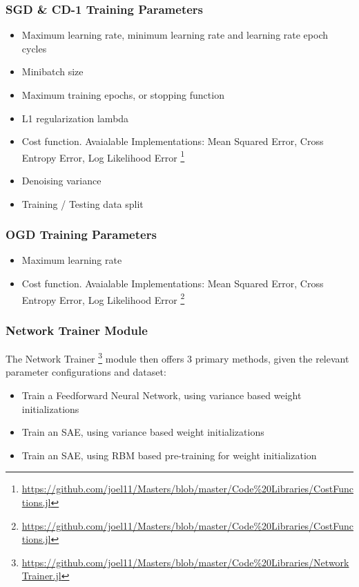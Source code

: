 \documentclass[a4paper,11pt,oneside]{article}
\theoremstyle{plain}
\theoremstyle{definition}
\begin{document}
\subsubsection{SGD \& CD-1 Training Parameters}
\begin{itemize}
	\item[1] Maximum learning rate, minimum learning rate and learning rate epoch cycles
	\item[2] Minibatch size
	\item[3] Maximum training epochs, or stopping function
	\item[4] L1 regularization lambda
	\item[5] Cost function. Avaialable Implementations: Mean Squared Error, Cross Entropy Error, Log Likelihood Error \footnote{\url{https://github.com/joel11/Masters/blob/master/Code\%20Libraries/CostFunctions.jl}}
	\item[6] Denoising variance
	\item[7] Training / Testing data split
\end{itemize}	

\subsubsection{OGD Training Parameters}
\begin{itemize}
	\item[1] Maximum learning rate
	\item[2] Cost function. Avaialable Implementations: Mean Squared Error, Cross Entropy Error, Log Likelihood Error \footnote{\url{https://github.com/joel11/Masters/blob/master/Code\%20Libraries/CostFunctions.jl}}
\end{itemize}	

\subsubsection{Network Trainer Module}

The Network Trainer \footnote{\url{https://github.com/joel11/Masters/blob/master/Code\%20Libraries/NetworkTrainer.jl}} module then offers 3 primary methods, given the relevant parameter configurations and dataset:

\begin{itemize}
	\item[1] Train a Feedforward Neural Network, using variance based weight initializations 
	\item[2] Train an SAE, using variance based weight initializations
	\item[3] Train an SAE, using RBM based pre-training for weight initialization
\end{itemize}
\end{document}
